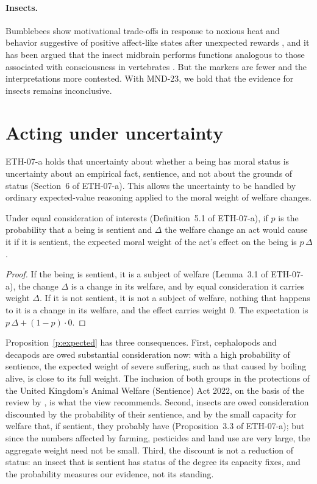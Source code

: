 \documentclass{situationist-preprint}
\begin{document}
\paragraph{Insects.} Bumblebees show motivational trade-offs in response to noxious heat \citep{Gibbons2022} and behavior suggestive of positive affect-like states after unexpected rewards \citep{Solvi2016}, and it has been argued that the insect midbrain performs functions analogous to those associated with consciousness in vertebrates \citep{Barron2016}. But the markers are fewer and the interpretations more contested. With MND-23, we hold that the evidence for insects remains inconclusive.

\section{Acting under uncertainty}

ETH-07-a holds that uncertainty about whether a being has moral status is uncertainty about an empirical fact, sentience, and not about the grounds of status (Section~6 of ETH-07-a). This allows the uncertainty to be handled by ordinary expected-value reasoning applied to the moral weight of welfare changes.

\begin{proposition}\label{p:expected}
Under equal consideration of interests (Definition~5.1 of ETH-07-a), if $p$ is the probability that a being is sentient and $\Delta$ the welfare change an act would cause it if it is sentient, the expected moral weight of the act's effect on the being is $p\,\Delta$.
\end{proposition}

\begin{proof}
If the being is sentient, it is a subject of welfare (Lemma~3.1 of ETH-07-a), the change $\Delta$ is a change in its welfare, and by equal consideration it carries weight $\Delta$. If it is not sentient, it is not a subject of welfare, nothing that happens to it is a change in its welfare, and the effect carries weight $0$. The expectation is $p\,\Delta + (1-p)\cdot 0$.
\end{proof}

Proposition~\ref{p:expected} has three consequences. First, cephalopods and decapods are owed substantial consideration now: with a high probability of sentience, the expected weight of severe suffering, such as that caused by boiling alive, is close to its full weight. The inclusion of both groups in the protections of the United Kingdom's Animal Welfare (Sentience) Act 2022, on the basis of the review by \citet{Birch2021}, is what the view recommends. Second, insects are owed consideration discounted by the probability of their sentience, and by the small capacity for welfare that, if sentient, they probably have (Proposition~3.3 of ETH-07-a); but since the numbers affected by farming, pesticides and land use are very large, the aggregate weight need not be small. Third, the discount is not a reduction of status: an insect that is sentient has status of the degree its capacity fixes, and the probability measures our evidence, not its standing.
\end{document}
